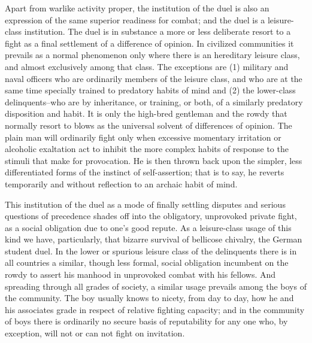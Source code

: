 \documentclass[12pt]{report}
\begin{document}
Apart from warlike activity proper, the institution of the duel is also
an expression of the same superior readiness for combat; and the duel
is a leisure-class institution. The duel is in substance a more or less
deliberate resort to a fight as a final settlement of a difference of
opinion. In civilized communities it prevails as a normal phenomenon
only where there is an hereditary leisure class, and almost exclusively
among that class. The exceptions are (1) military and naval officers
who are ordinarily members of the leisure class, and who are at the
same time specially trained to predatory habits of mind and (2) the
lower-class delinquents--who are by inheritance, or training, or both,
of a similarly predatory disposition and habit. It is only the high-bred
gentleman and the rowdy that normally resort to blows as the universal
solvent of differences of opinion. The plain man will ordinarily fight
only when excessive momentary irritation or alcoholic exaltation act to
inhibit the more complex habits of response to the stimuli that make
for provocation. He is then thrown back upon the simpler, less
differentiated forms of the instinct of self-assertion; that is to say,
he reverts temporarily and without reflection to an archaic habit of
mind.

This institution of the duel as a mode of finally settling disputes
and serious questions of precedence shades off into the obligatory,
unprovoked private fight, as a social obligation due to one's good
repute. As a leisure-class usage of this kind we have, particularly,
that bizarre survival of bellicose chivalry, the German student duel. In
the lower or spurious leisure class of the delinquents there is in all
countries a similar, though less formal, social obligation incumbent on
the rowdy to assert his manhood in unprovoked combat with his fellows.
And spreading through all grades of society, a similar usage prevails
among the boys of the community. The boy usually knows to nicety, from
day to day, how he and his associates grade in respect of relative
fighting capacity; and in the community of boys there is ordinarily no
secure basis of reputability for any one who, by exception, will not or
can not fight on invitation.
\end{document}
